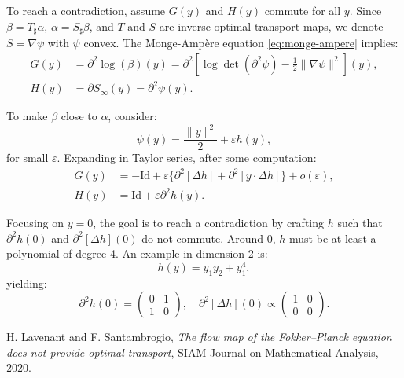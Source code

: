 \documentclass{article}
\begin{document}
To reach a contradiction, assume $G(y)$ and $H(y)$ commute for all $y$. Since $\beta = T_\sharp \alpha$, $\alpha = S_\sharp \beta$, and $T$ and $S$ are inverse optimal transport maps, we denote $S = \nabla \psi$ with $\psi$ convex. The Monge-Ampère equation \eqref{eq:monge-ampere} implies:
\begin{align*}
    G(y) &= \partial^2 \log(\beta)(y) = \partial^2 \left[\log\det(\partial^2 \psi) - \frac{1}{2} \|\nabla \psi\|^2\right](y), \\
    H(y) &= \partial S_\infty(y) = \partial^2 \psi(y).
\end{align*}

To make $\beta$ close to $\alpha$, consider:
\[
    \psi(y) = \frac{\|y\|^2}{2} + \varepsilon h(y),
\]
for small $\varepsilon$. Expanding in Taylor series, after some computation:
\begin{align*}
    G(y) &= -\text{Id} + \varepsilon \{\partial^2[\Delta h] + \partial^2[y \cdot \Delta h]\} + o(\varepsilon), \\
    H(y) &= \text{Id} + \varepsilon \partial^2 h(y).
\end{align*}

Focusing on $y = 0$, the goal is to reach a contradiction by crafting $h$ such that  $\partial^2 h(0)$  and   $\partial^2[\Delta h](0)$ do not commute. 
Around $0$, $h$ must be at least a polynomial of degree 4. An example in dimension 2 is:
\[
    h(y) = y_1 y_2 + y_1^4,
\]
yielding:
\[
    \partial^2 h(0) = \begin{pmatrix} 0 & 1 \\ 1 & 0 \end{pmatrix}, \quad 
    \partial^2[\Delta h](0) \propto \begin{pmatrix} 1 & 0 \\ 0 & 0 \end{pmatrix}.
\]

\begin{thebibliography}{9}
    H. Lavenant and F. Santambrogio, \emph{The flow map of the Fokker--Planck equation does not provide optimal transport}, SIAM Journal on Mathematical Analysis, 2020.
\end{thebibliography}
\end{document}
